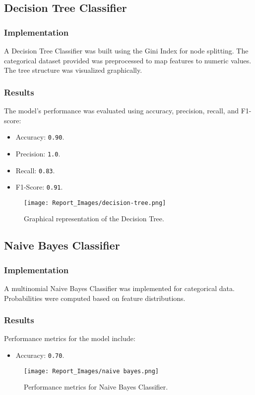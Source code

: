 \documentclass[12pt]{article}
\begin{document}
\subsection{Decision Tree Classifier}
\subsubsection{Implementation}
A Decision Tree Classifier was built using the Gini Index for node splitting. The categorical dataset provided was preprocessed to map features to numeric values. The tree structure was visualized graphically.

\subsubsection{Results}
The model's performance was evaluated using accuracy, precision, recall, and F1-score:
\begin{itemize}
    \item Accuracy: \texttt{0.90}.
    \item Precision: \texttt{1.0}.
    \item Recall: \texttt{0.83}.
    \item F1-Score: \texttt{0.91}.
\end{itemize}
\begin{figure}[h!]
    \centering
    \texttt{[image: Report\_Images/decision-tree.png]}
    \caption{Graphical representation of the Decision Tree.}
    \label{fig:decision_tree}
\end{figure}

\subsection{Naive Bayes Classifier}
\subsubsection{Implementation}
A multinomial Naive Bayes Classifier was implemented for categorical data. Probabilities were computed based on feature distributions.

\subsubsection{Results}
Performance metrics for the model include:
\begin{itemize}
    \item Accuracy: \texttt{0.70}.
\end{itemize}
\begin{figure}[h!]
    \centering
    \texttt{[image: Report\_Images/naive bayes.png]}
    \caption{Performance metrics for Naive Bayes Classifier.}
    \label{fig:Naive Bayes}
\end{figure}
\end{document}
